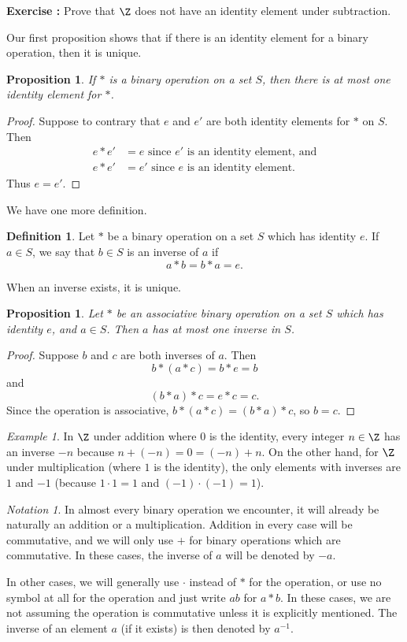 \documentclass[12pt]{amsart}
\newcommand{\terminology}[1]{\textbf{\textit{#1}}}
\renewcommand{\terminology}[1]{#1}
\newcommand{\term}{\terminology}
\newcounter{probs}
\newenvironment{prob}{%
  \refstepcounter{probs}
  \par\medskip\noindent\textbf{Exercise \theprobs:} }{\par\medskip}
\theoremstyle{plain}
\newtheorem{prop}[thm]{Proposition}
\theoremstyle{definition}
\newtheorem{defn}[thm]{Definition}
\theoremstyle{remark}
\newtheorem*{notation}{Notation}
\newtheorem*{exam}{Example}
\begin{document}
\begin{prob}
Prove that $\Z$ does not have an identity element under subtraction.
\end{prob}

Our first proposition shows that if there is an identity element for a
binary operation, then it is unique.
\begin{prop} \label{unique-identity}
  If $*$ is a binary operation on a set $S$, then there is at most one
  identity element for $*$.
\end{prop}
\begin{proof}
  Suppose to contrary that $e$ and $e'$ are both identity elements
  for $*$ on $S$.  Then
  \begin{align*}
    e*e' &= e \text{ since $e'$ is an identity element, and} \\
    e*e' &= e' \text{ since $e$ is an identity element.}
  \end{align*}
  Thus $e=e'$.
\end{proof}
We have one more definition.
\begin{defn}
  Let $*$ be a binary operation on a set $S$ which has identity $e$.
  If $a\in S$, we say that $b\in S$ is an \term{inverse} of $a$ if
  \[ a*b=b*a=e.\]
\end{defn}
When an inverse exists, it is unique.
\begin{prop} \label{unique-inverse}
  Let $*$ be an associative binary operation on a set $S$ which has
  identity $e$, and $a\in S$.  Then $a$ has at most one inverse in
  $S$.
\end{prop}
\begin{proof}
  Suppose $b$ and $c$ are both inverses of $a$.  Then
\[ b*(a*c) = b*e= b\]
and
\[ (b*a)*c = e*c=c.\]
Since the operation is associative, $b*(a*c)=(b*a)*c$, so $b=c$.
\end{proof}

\begin{exam}
In $\Z$ under addition where $0$ is the identity, every integer
$n\in\Z$ has an inverse $-n$ because $n+(-n) = 0=(-n)+n$.  On the
other hand, for $\Z$ under multiplication (where $1$ is the identity),
the only elements with inverses are $1$ and $-1$ (because $1\cdot 1 =
1$ and $(-1)\cdot (-1) = 1$).
\end{exam}

\begin{notation}
  In almost every binary operation we encounter, it will already be
  naturally an addition or a multiplication.  Addition in every case
  will be commutative, and we will only use $+$ for binary operations
  which are commutative.  In these cases, the inverse of $a$ will be
  denoted by $-a$.

  In other cases, we will generally use $\cdot$ instead of $*$ for the
  operation, or use no symbol at all for the operation and just write
  $ab$ for $a*b$.  In these cases, we are not assuming the operation
  is commutative unless it is explicitly mentioned.  The inverse of an
  element $a$ (if it exists) is then denoted by $a^{-1}$.
\end{notation}
\end{document}
